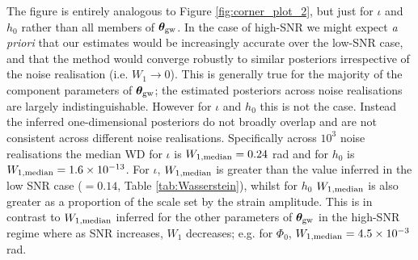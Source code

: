 \documentclass[fleqn,usenatbib,useAMS]{mnras}
\begin{document}
The figure is entirely analogous to Figure \ref{fig:corner_plot_2}, but just for $\iota$ and $h_0$ rather than all members of $\boldsymbol{\theta}_{\rm gw}$. In the case of high-SNR we might expect \textit{a priori} that our estimates would be increasingly accurate over the low-SNR case, and that the method would converge robustly to similar posteriors irrespective of the noise realisation (i.e. $W_1 \to 0$). This is generally true for the majority of the component parameters of $\boldsymbol{\theta}_{\rm gw}$; the estimated posteriors across noise realisations are largely indistinguishable. However for $\iota$ and $h_0$ this is not the case. Instead the inferred one-dimensional posteriors do not broadly overlap and are not consistent across different noise realisations. Specifically across $10^3$ noise realisations the median WD for $\iota$ is $W_{1, \rm median}=0.24$ rad and for $h_0$ is  $W_{1, \rm median}=1.6 \times 10^{-13}$. For $\iota$, $W_{1,\rm median}$ is greater than the value inferred in the low SNR case ($=0.14$, Table \ref{tab:Wasserstein}), whilst for $h_0$ $W_{1,\rm median}$ is also greater as a proportion of the scale set by the strain amplitude. This is in contrast to $W_{1,\rm median}$ inferred for the other parameters of $\boldsymbol{\theta}_{\rm gw}$ in the high-SNR regime where as SNR increases, $W_1$ decreases; e.g. for $\Phi_0$, $W_{1, \rm median} = 4.5 \times 10^{-3}$ rad. \newline 
\end{document}
